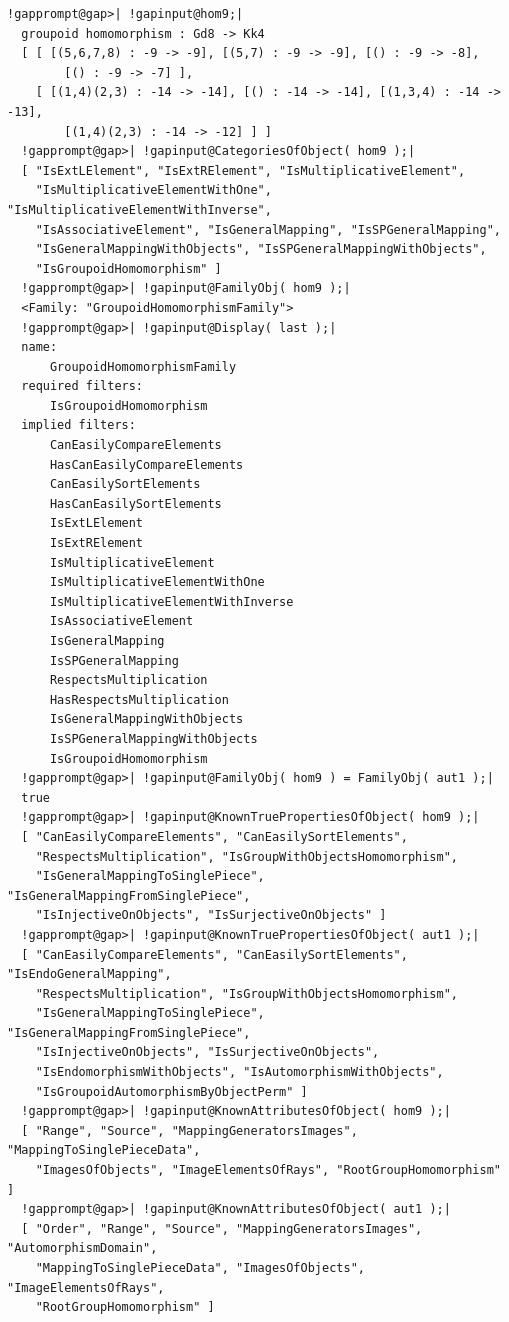 \documentclass[a4paper,11pt]{report}
\begin{document}
{{\begin{Verbatim}[commandchars=!@|,fontsize=\small,frame=single,label=Example]
  !gapprompt@gap>| !gapinput@hom9;|
  groupoid homomorphism : Gd8 -> Kk4
  [ [ [(5,6,7,8) : -9 -> -9], [(5,7) : -9 -> -9], [() : -9 -> -8], 
        [() : -9 -> -7] ], 
    [ [(1,4)(2,3) : -14 -> -14], [() : -14 -> -14], [(1,3,4) : -14 -> -13], 
        [(1,4)(2,3) : -14 -> -12] ] ]
  !gapprompt@gap>| !gapinput@CategoriesOfObject( hom9 );|
  [ "IsExtLElement", "IsExtRElement", "IsMultiplicativeElement", 
    "IsMultiplicativeElementWithOne", "IsMultiplicativeElementWithInverse", 
    "IsAssociativeElement", "IsGeneralMapping", "IsSPGeneralMapping", 
    "IsGeneralMappingWithObjects", "IsSPGeneralMappingWithObjects", 
    "IsGroupoidHomomorphism" ]
  !gapprompt@gap>| !gapinput@FamilyObj( hom9 );|
  <Family: "GroupoidHomomorphismFamily">
  !gapprompt@gap>| !gapinput@Display( last );|
  name:
      GroupoidHomomorphismFamily
  required filters:
      IsGroupoidHomomorphism
  implied filters:
      CanEasilyCompareElements
      HasCanEasilyCompareElements
      CanEasilySortElements
      HasCanEasilySortElements
      IsExtLElement
      IsExtRElement
      IsMultiplicativeElement
      IsMultiplicativeElementWithOne
      IsMultiplicativeElementWithInverse
      IsAssociativeElement
      IsGeneralMapping
      IsSPGeneralMapping
      RespectsMultiplication
      HasRespectsMultiplication
      IsGeneralMappingWithObjects
      IsSPGeneralMappingWithObjects
      IsGroupoidHomomorphism
  !gapprompt@gap>| !gapinput@FamilyObj( hom9 ) = FamilyObj( aut1 );|
  true
  !gapprompt@gap>| !gapinput@KnownTruePropertiesOfObject( hom9 );|
  [ "CanEasilyCompareElements", "CanEasilySortElements", 
    "RespectsMultiplication", "IsGroupWithObjectsHomomorphism", 
    "IsGeneralMappingToSinglePiece", "IsGeneralMappingFromSinglePiece", 
    "IsInjectiveOnObjects", "IsSurjectiveOnObjects" ]
  !gapprompt@gap>| !gapinput@KnownTruePropertiesOfObject( aut1 );|
  [ "CanEasilyCompareElements", "CanEasilySortElements", "IsEndoGeneralMapping",
    "RespectsMultiplication", "IsGroupWithObjectsHomomorphism", 
    "IsGeneralMappingToSinglePiece", "IsGeneralMappingFromSinglePiece", 
    "IsInjectiveOnObjects", "IsSurjectiveOnObjects", 
    "IsEndomorphismWithObjects", "IsAutomorphismWithObjects", 
    "IsGroupoidAutomorphismByObjectPerm" ]
  !gapprompt@gap>| !gapinput@KnownAttributesOfObject( hom9 );|
  [ "Range", "Source", "MappingGeneratorsImages", "MappingToSinglePieceData", 
    "ImagesOfObjects", "ImageElementsOfRays", "RootGroupHomomorphism" ]
  !gapprompt@gap>| !gapinput@KnownAttributesOfObject( aut1 );|
  [ "Order", "Range", "Source", "MappingGeneratorsImages", "AutomorphismDomain",
    "MappingToSinglePieceData", "ImagesOfObjects", "ImageElementsOfRays", 
    "RootGroupHomomorphism" ]
  
\end{Verbatim}
 }

 }
\end{document}
